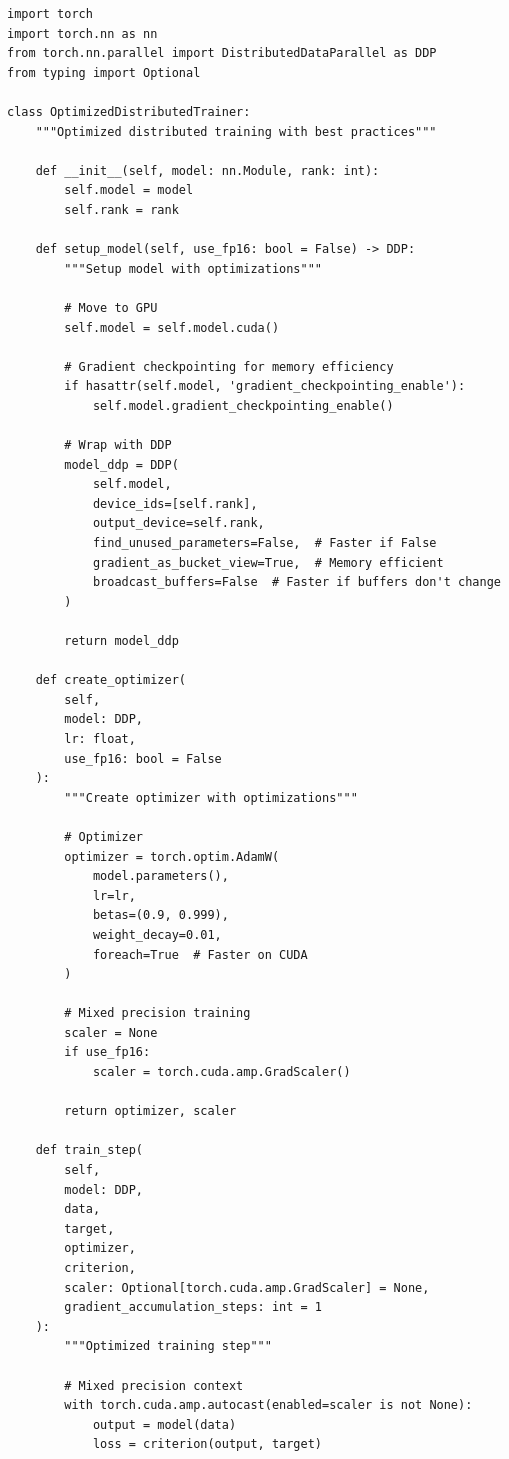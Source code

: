 \begin{lstlisting}[style=python, caption=Distributed Training Optimizations]
import torch
import torch.nn as nn
from torch.nn.parallel import DistributedDataParallel as DDP
from typing import Optional

class OptimizedDistributedTrainer:
    """Optimized distributed training with best practices"""

    def __init__(self, model: nn.Module, rank: int):
        self.model = model
        self.rank = rank

    def setup_model(self, use_fp16: bool = False) -> DDP:
        """Setup model with optimizations"""

        # Move to GPU
        self.model = self.model.cuda()

        # Gradient checkpointing for memory efficiency
        if hasattr(self.model, 'gradient_checkpointing_enable'):
            self.model.gradient_checkpointing_enable()

        # Wrap with DDP
        model_ddp = DDP(
            self.model,
            device_ids=[self.rank],
            output_device=self.rank,
            find_unused_parameters=False,  # Faster if False
            gradient_as_bucket_view=True,  # Memory efficient
            broadcast_buffers=False  # Faster if buffers don't change
        )

        return model_ddp

    def create_optimizer(
        self,
        model: DDP,
        lr: float,
        use_fp16: bool = False
    ):
        """Create optimizer with optimizations"""

        # Optimizer
        optimizer = torch.optim.AdamW(
            model.parameters(),
            lr=lr,
            betas=(0.9, 0.999),
            weight_decay=0.01,
            foreach=True  # Faster on CUDA
        )

        # Mixed precision training
        scaler = None
        if use_fp16:
            scaler = torch.cuda.amp.GradScaler()

        return optimizer, scaler

    def train_step(
        self,
        model: DDP,
        data,
        target,
        optimizer,
        criterion,
        scaler: Optional[torch.cuda.amp.GradScaler] = None,
        gradient_accumulation_steps: int = 1
    ):
        """Optimized training step"""

        # Mixed precision context
        with torch.cuda.amp.autocast(enabled=scaler is not None):
            output = model(data)
            loss = criterion(output, target)


\end{lstlisting}
